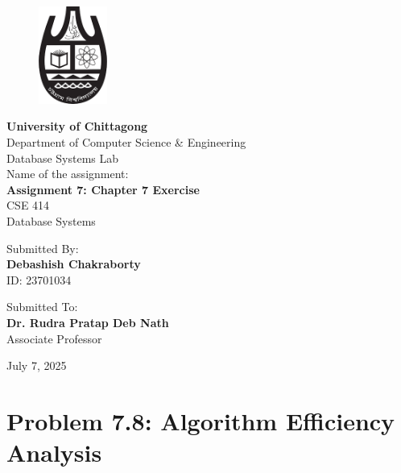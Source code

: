 \documentclass[12pt,a4paper]{article}
\begin{document}
\begin{titlepage}
    \begin{figure}[htbp]
    \centering
    \includegraphics[width=0.2\textwidth]{cu.png}
    \end{figure}
    \centering
    \vspace*{0.5cm}
    {\Huge\bfseries University of Chittagong}\\[0.5cm]
    {\Large Department of Computer Science \& Engineering}\\[0.5cm]
    {\large Database Systems Lab}\\[2cm]
    
    {\large Name of the assignment:}\\[0.3cm]
    {\LARGE\bfseries Assignment 7: Chapter 7 Exercise\\[0.5cm]}
    {\large CSE 414}\\[0.5cm]
    {\large Database Systems}\\[3.5cm]
    
    \begin{minipage}[t]{0.4\textwidth}
    \raggedleft
    Submitted By:\\
    \large \textbf{Debashish Chakraborty}\\
    \large ID: 23701034
    \end{minipage}              
    \hspace{0.05\textwidth}
    \vrule width 1pt
    \hspace{0.05\textwidth}
    \begin{minipage}[t]{0.4\textwidth}
    Submitted To:\\
    \large \textbf{Dr. Rudra Pratap Deb Nath}\\
    \large Associate Professor
    \end{minipage}
    
    \vfill
    {\large July 7, 2025}
\end{titlepage}

\newpage

\section{Problem 7.8: Algorithm Efficiency Analysis}
\end{document}
